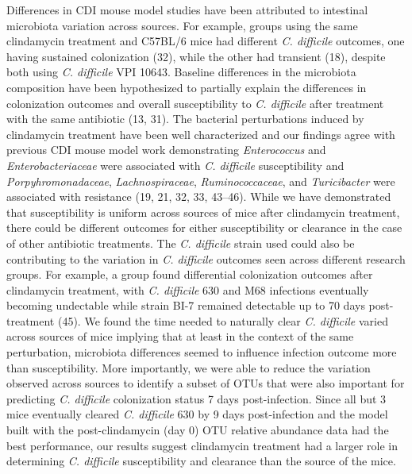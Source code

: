 \documentclass[
  11pt,
]{article}
\begin{document}
Differences in CDI mouse model studies have been attributed to
intestinal microbiota variation across sources. For example, groups
using the same clindamycin treatment and C57BL/6 mice had different
\emph{C. difficile} outcomes, one having sustained colonization (32),
while the other had transient (18), despite both using \emph{C.
difficile} VPI 10643. Baseline differences in the microbiota composition
have been hypothesized to partially explain the differences in
colonization outcomes and overall susceptibility to \emph{C. difficile}
after treatment with the same antibiotic (13, 31). The bacterial
perturbations induced by clindamycin treatment have been well
characterized and our findings agree with previous CDI mouse model work
demonstrating \emph{Enterococcus} and \emph{Enterobacteriaceae} were
associated with \emph{C. difficile} susceptibility and
\emph{Porpyhromonadaceae}, \emph{Lachnospiraceae},
\emph{Ruminococcaceae}, and \emph{Turicibacter} were associated with
resistance (19, 21, 32, 33, 43--46). While we have demonstrated that
susceptibility is uniform across sources of mice after clindamycin
treatment, there could be different outcomes for either susceptibility
or clearance in the case of other antibiotic treatments. The \emph{C.
difficile} strain used could also be contributing to the variation in
\emph{C. difficile} outcomes seen across different research groups. For
example, a group found differential colonization outcomes after
clindamycin treatment, with \emph{C. difficile} 630 and M68 infections
eventually becoming undectable while strain BI-7 remained detectable up
to 70 days post-treatment (45). We found the time needed to naturally
clear \emph{C. difficile} varied across sources of mice implying that at
least in the context of the same perturbation, microbiota differences
seemed to influence infection outcome more than susceptibility. More
importantly, we were able to reduce the variation observed across
sources to identify a subset of OTUs that were also important for
predicting \emph{C. difficile} colonization status 7 days
post-infection. Since all but 3 mice eventually cleared \emph{C.
difficile} 630 by 9 days post-infection and the model built with the
post-clindamycin (day 0) OTU relative abundance data had the best
performance, our results suggest clindamycin treatment had a larger role
in determining \emph{C. difficile} susceptibility and clearance than the
source of the mice.
\end{document}
